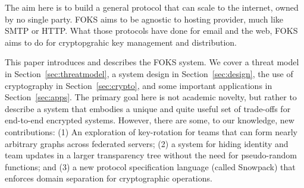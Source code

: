 The aim here is to build a general protocol that can scale to the internet, 
owned by no single party. FOKS aims to be agnostic to hosting provider, much
like SMTP or HTTP. What those protocols have done for email and the web, FOKS
aims to do for cryptopgrahic key management and distribution.

This paper introduces and describes the FOKS system. We cover a threat model
in Section~\ref{sec:threatmodel}, a system design in Section~\ref{sec:design}, 
the use of cryptography in Section~\ref{sec:crypto}, and some important applications
in Section~\ref{sec:apps}. The primary goal here is not academic novelty, but
rather to describe a system that embodies a unique
and quite useful set of trade-offs for end-to-end encrypted systems.
However, there are some, to our knowledge, new contributions:
%
(1) An exploration of key-rotation for teams that can form
      nearly arbitrary graphs across federated servers;
%
(2) a system for hiding identity and team updates in a larger
      transparency tree without the need
      for pseudo-random functions; and
%
(3) a new protocol specification language (called Snowpack) that enforces
  domain separation for cryptographic operations.
